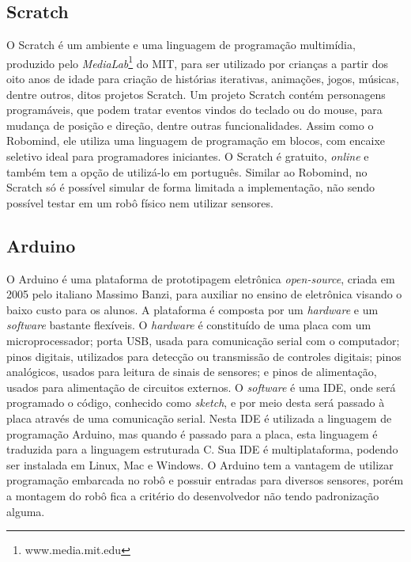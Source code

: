 \subsection{Scratch}
O Scratch é um ambiente e uma linguagem de programação multimídia, produzido pelo \textit{MediaLab}\footnote{www.media.mit.edu} do MIT, para ser utilizado por crianças a partir dos oito anos de idade para criação de histórias iterativas, animações, jogos, músicas, dentre outros, ditos projetos Scratch. 
Um projeto Scratch contém personagens programáveis, que podem tratar eventos vindos do teclado ou do mouse, para mudança de posição e direção, dentre outras funcionalidades.
Assim como o Robomind, ele utiliza uma linguagem de programação em blocos, com encaixe seletivo ideal para programadores iniciantes. O Scratch é gratuito, \textit{online} e também tem a opção de utilizá-lo em português.
Similar ao Robomind, no Scratch só é possível simular de forma limitada a implementação, não sendo possível testar em um robô físico nem utilizar sensores.

\subsection{Arduino}
O Arduino é uma plataforma de prototipagem eletrônica \textit{open-source}, criada em 2005 pelo italiano Massimo Banzi, para auxiliar no ensino de eletrônica visando o baixo custo para os alunos. A plataforma é composta por um \textit{hardware} e um \textit{software} bastante flexíveis. 
O \textit{hardware} é constituído de uma placa com um microprocessador; porta USB, usada para comunicação serial com o computador; pinos digitais, utilizados para detecção ou transmissão de controles digitais; pinos analógicos, usados para leitura de sinais de sensores; e pinos de alimentação, usados para alimentação de circuitos externos. 
O \textit{software} é uma IDE, onde será programado o código, conhecido como \textit{sketch}, e por meio desta será passado à placa através de uma comunicação serial. Nesta IDE é utilizada a linguagem de programação Arduino, mas quando é passado para a placa, esta linguagem é traduzida para a linguagem estruturada C. Sua IDE é multiplataforma, podendo ser instalada em Linux, Mac e Windows.
O Arduino tem a vantagem de utilizar programação embarcada no robô e possuir entradas para diversos sensores, porém a montagem do robô fica a critério do desenvolvedor não tendo padronização alguma.

